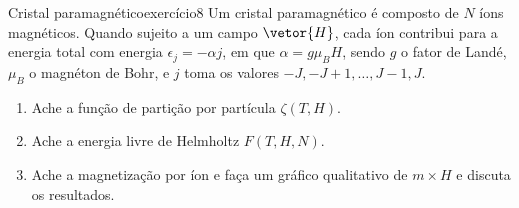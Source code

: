 \begin{exercício}{Cristal paramagnético}{exercício8}
    Um cristal paramagnético é composto de \(N\) íons magnéticos. Quando sujeito a um campo \(\vetor{H}\), cada íon contribui para a energia total com energia \(\epsilon_j = -\alpha j\), em que \(\alpha = g \mu_B H\), sendo \(g\) o fator de Landé, \(\mu_B\) o magnéton de Bohr, e \(j\) toma os valores \(-J, -J + 1, \dots, J-1, J\).
    \begin{enumerate}[label=(\alph*)]
        \item Ache a função de partição por partícula \(\zeta(T, H)\).
        \item Ache a energia livre de Helmholtz \(F(T, H, N)\).
        \item Ache a magnetização por íon e faça um gráfico qualitativo de \(m \times H\) e discuta os resultados.
    \end{enumerate}
\end{exercício}
